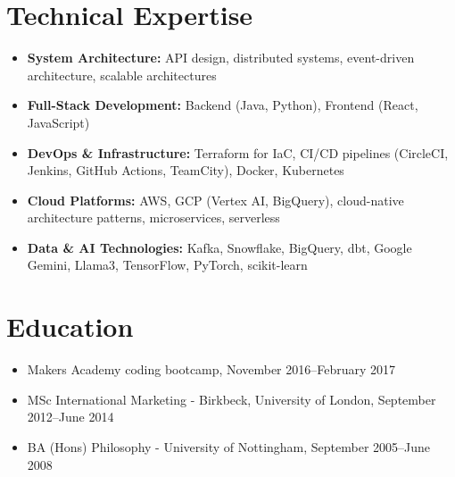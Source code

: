 \documentclass[a4paper]{scrartcl}
\begin{document}
\section*{Technical Expertise}
\begin{itemize}
	\item \textbf{System Architecture:} API design, distributed systems, event-driven architecture, scalable architectures
	\item \textbf{Full-Stack Development:} Backend (Java, Python), Frontend (React, JavaScript)
	\item \textbf{DevOps \& Infrastructure:} Terraform for IaC, CI/CD pipelines (CircleCI, Jenkins, GitHub Actions, TeamCity), Docker, Kubernetes
	\item \textbf{Cloud Platforms:} AWS, GCP (Vertex AI, BigQuery), cloud-native architecture patterns, microservices, serverless
	\item \textbf{Data \& AI Technologies:} Kafka, Snowflake, BigQuery, dbt, Google Gemini, Llama3, TensorFlow, PyTorch, scikit-learn
\end{itemize}

\section*{Education}
\begin{itemize}
	\item Makers Academy coding bootcamp, November 2016--February 2017
	\item MSc International Marketing - Birkbeck, University of London, September 2012--June 2014
	\item BA (Hons) Philosophy - University of Nottingham, September 2005--June 2008
\end{itemize}
\end{document}
